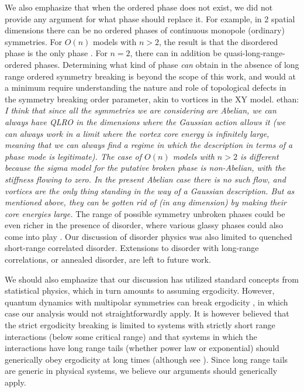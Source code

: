 \documentclass[pra,aps,twocolumn, amsfonts,amsmath,amssymb,nofootinbib,superscriptaddress]{revtex4-2}
\newcommand{\ethan}[1]{ { \color{blue} \footnotesize \textsf{ethan: \textsl{#1}} }}
\providecommand{\DIFaddbegin}{} %
\providecommand{\DIFaddend}{} %
\newcommand{\DIFaddincludegraphics}[2][]{{\color{blue}\fbox{\DIFOincludegraphics[#1]{#2}}}} %
\DeclareRobustCommand{\DIFaddbegin}{\DIFOaddbegin \let\includegraphics\DIFaddincludegraphics} %
\DeclareRobustCommand{\DIFaddend}{\DIFOaddend \let\includegraphics\DIFOincludegraphics} %
\begin{document}
We also emphasize that when the ordered phase does not exist, we did not provide any argument for what phase should replace it. For example, in 2 spatial dimensions there can be no ordered phases of continuous monopole (ordinary) symmetries. For $O(n)$ models with $n>2$, the result is that the disordered phase is the only phase \cite{polyakov}. For $n=2$, there can in addition be quasi-long-range-ordered phases. Determining what kind of phase {\it can} obtain in the absence of long range ordered symmetry breaking is beyond the scope of this work, and would at a minimum require understanding the nature and role of topological defects in the symmetry breaking order parameter, akin to vortices in the XY model. \DIFaddbegin \ethan{I think that since all the symmetries we are considering are Abelian, we can always have QLRO in the dimensions where the Gaussian action allows it (we can always work in a limit where the vortex core energy is infinitely large, meaning that we can always find a regime in which the description in terms of a phase mode is legitimate). The case of $O(n)$ models with $n>2$ is different because the sigma model for the putative broken phase is non-Abelian, with the stiffness flowing to zero. In the present Abelian case there is no such flow, and vortices are the only thing standing in the way of a Gaussian description. But as mentioned above, they can be gotten rid of (in any dimension) by making their core energies large.} \DIFaddend The range of possible symmetry unbroken phases could be even richer in the presence of disorder, where various glassy phases could also come into play \cite{Fisheretal}. Our discussion of disorder physics was also limited to quenched short-range correlated disorder. Extensions to disorder with long-range correlations, or annealed disorder, are left to future work.

We should also emphasize that our discussion has utilized standard concepts from statistical physics, which in turn amounts to assuming ergodicity. However, quantum dynamics with multipolar symmetries can break ergodicity \cite{KHN, Sala}, in which case our analysis would not straightforwardly apply. It is however believed that the strict ergodicity breaking is limited to systems with strictly short range interactions (below some critical range) and that systems in which the interactions have long range tails (whether power law or exponential) should generically obey ergodicity at long times (although see \cite{NS}). Since long range tails are generic in physical systems, we believe our arguments should generically apply.  
\end{document}
